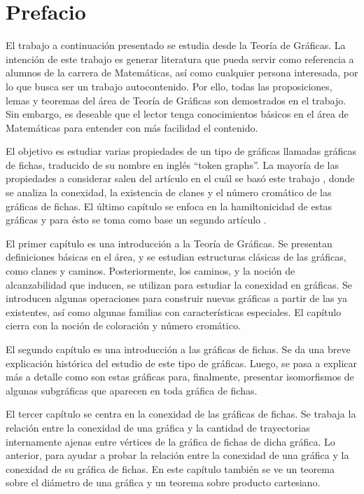 \chapter{Prefacio}
\label{sec:prefacio}

El trabajo a continuaci\'on presentado se estudia desde la Teor\'ia de
Gr\'aficas. La intenci\'on de este trabajo es generar literatura que pueda
servir como referencia a alumnos de la carrera de Matem\'aticas, as\'i como
cualquier persona interesada, por lo que busca ser un trabajo autocontenido. Por
ello, todas las proposiciones, lemas y teoremas del \'area de Teor\'ia de
Gr\'aficas son demostrados en el trabajo. Sin embargo, es deseable que el lector
tenga conocimientos b\'asicos en el \'area de Matem\'aticas para entender con
m\'as facilidad el contenido. 

El objetivo es estudiar varias propiedades de un tipo de gr\'aficas llamadas
gr\'aficas de fichas, traducido de su nombre en ingl\'es ``token graphs''. La
mayor\'ia de las propiedades a considerar salen del art\'iculo en el cu\'al se
bas\'o este trabajo \cite{fabilaToken}, donde se analiza la conexidad, la
existencia de clanes y el n\'umero crom\'atico de las gr\'aficas de fichas. El
\'ultimo cap\'itulo se enfoca en la hamiltonicidad de estas gr\'aficas y para
\'esto se toma como base un segundo art\'iculo \cite{adameHamilt}. 

El primer cap\'itulo es una introducci\'on a la Teor\'ia de Gr\'aficas.  Se
presentan definiciones b\'asicas en el \'area, y se estudian estructuras
cl\'asicas de las gr\'aficas, como clanes y caminos.   Posteriormente, los
caminos, y la noci\'on de alcanzabilidad que inducen, se utilizan para estudiar
la conexidad en gr\'aficas.   Se introducen algunas operaciones para construir
nuevas gr\'aficas a partir de las ya existentes, as\'i como algunas familias con
caracter\'isticas especiales.   El cap\'itulo cierra con la noci\'on de
coloraci\'on y n\'umero crom\'atico.

El segundo cap\'itulo es una introducci\'on a las gr\'aficas de fichas. Se da
una breve explicaci\'on hist\'orica del estudio de este tipo de gr\'aficas.
Luego, se pasa a explicar m\'as a detalle como son estas gr\'aficas para,
finalmente, presentar isomorfismos de algunas subgr\'aficas que aparecen en toda
gr\'afica de fichas.

El tercer cap\'itulo se centra en la conexidad de las gr\'aficas de fichas. Se
trabaja la relaci\'on entre la conexidad de una gr\'afica y la cantidad de
trayectorias internamente ajenas entre v\'ertices de la gr\'afica de fichas de
dicha gr\'afica. Lo anterior, para ayudar a probar la relaci\'on entre la
conexidad de una gr\'afica y la conexidad de su gr\'afica de fichas. En este
cap\'itulo tambi\'en se ve un teorema sobre el di\'ametro de una gr\'afica y un
teorema sobre producto cartesiano.

